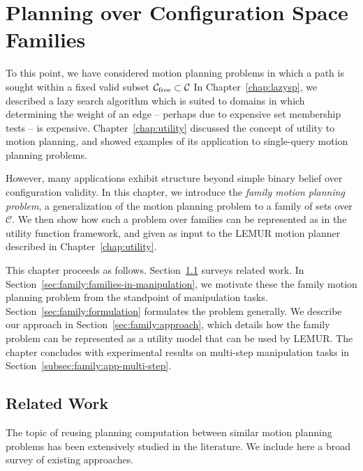 \chapter{Planning over Configuration Space Families}
\label{chap:family}

To this point,
we have considered motion planning problems in which a path is sought
within a fixed valid subset
$\mathcal{C}_{\mbox{\scriptsize free}} \subset \mathcal{C}$
In Chapter~\ref{chap:lazysp},
we described a lazy search algorithm which is suited to domains in
which determining the weight of an edge
-- perhaps due to expensive set membership tests --
is expensive.
Chapter~\ref{chap:utility} discussed the concept of utility to
motion planning,
and showed examples of its application to single-query motion
planning problems.

However,
many applications exhibit structure beyond simple binary belief over
configuration validity.
In this chapter,
we introduce the \emph{family motion planning problem},
a generalization of the motion planning problem to a family of sets
over $\mathcal{C}$.
We then show how such a problem over families can be represented
as in the utility function framework,
and given as input to the LEMUR motion planner described
in Chapter~\ref{chap:utility}.

This chapter proceeds as follows.
Section~\ref{sec:family:related-work} surveys related work.
In Section~\ref{sec:family:families-in-manipulation},
we motivate these the family motion planning problem
from the standpoint of manipulation tasks.
Section~\ref{sec:family:formulation} formulates the problem
generally.
We describe our approach in Section~\ref{sec:family:approach},
which details how the family problem can be represented
as a utility model that can be used by LEMUR.
The chapter concludes with experimental results on multi-step
manipulation tasks in Section~\ref{subsec:family:app-multi-step}.

\section{Related Work}
\label{sec:family:related-work}

The topic of reusing planning computation
between similar motion planning problems
has been extensively studied in the literature.
We include here a broad survey of existing approaches.

